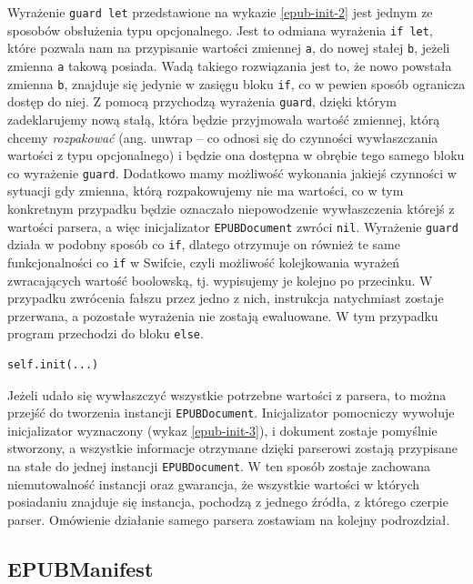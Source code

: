 Wyrażenie \texttt{guard let} przedstawione na wykazie \ref{epub-init-2} jest jednym ze sposobów obsłużenia typu opcjonalnego. Jest to odmiana wyrażenia \texttt{if let}, które pozwala nam na przypisanie wartości zmiennej \texttt{a}, do nowej stałej \texttt{b}, jeżeli zmienna \texttt{a} takową posiada. Wadą takiego rozwiązania jest to, że nowo powstała zmienna \texttt{b}, znajduje się jedynie w zasięgu bloku \texttt{if}, co w pewien sposób ogranicza dostęp do niej. Z pomocą przychodzą wyrażenia \texttt{guard}, dzięki którym zadeklarujemy nową stałą, która będzie przyjmowała wartość zmiennej, którą chcemy \textit{rozpakować} (ang. unwrap -- co odnosi się do czynności wywłaszczania wartości z typu opcjonalnego) i będzie ona dostępna w obrębie tego samego bloku co wyrażenie \texttt{guard}. Dodatkowo mamy możliwość wykonania jakiejś czynności w sytuacji gdy zmienna, którą rozpakowujemy nie ma wartości, co w tym konkretnym przypadku będzie oznaczało niepowodzenie wywłaszczenia którejś z wartości parsera, a więc inicjalizator \texttt{EPUBDocument} zwróci \texttt{nil}. Wyrażenie \texttt{guard} działa w podobny sposób co \texttt{if}, dlatego otrzymuje on również te same funkcjonalności co \texttt{if} w Swifcie, czyli możliwość kolejkowania wyrażeń zwracających wartość boolowską, tj. wypisujemy je kolejno po przecinku. W przypadku zwrócenia fałszu przez jedno z nich, instrukcja natychmiast zostaje przerwana, a pozostałe wyrażenia nie zostają ewaluowane. W tym przypadku program przechodzi do bloku \texttt{else}.

\begin{lstlisting}[language=swift-reference,caption={Inicjalizaca danymi z parsera},label={epub-init-3}]
self.init(...)
\end{lstlisting}

Jeżeli udało się wywłaszczyć wszystkie potrzebne wartości z parsera, to można przejść do tworzenia instancji \texttt{EPUBDocument}. Inicjalizator pomocniczy wywołuje inicjalizator wyznaczony (wykaz \ref{epub-init-3}), i dokument zostaje pomyślnie stworzony, a wszystkie informacje otrzymane dzięki parserowi zostają przypisane na stałe do jednej instancji \texttt{EPUBDocument}. W ten sposób zostaje zachowana niemutowalność instancji oraz gwarancja, że wszystkie wartości w których posiadaniu znajduje się instancja, pochodzą z jednego źródła, z którego czerpie parser. Omówienie działanie samego parsera zostawiam na kolejny podrozdział.

\subsection{EPUBManifest}

